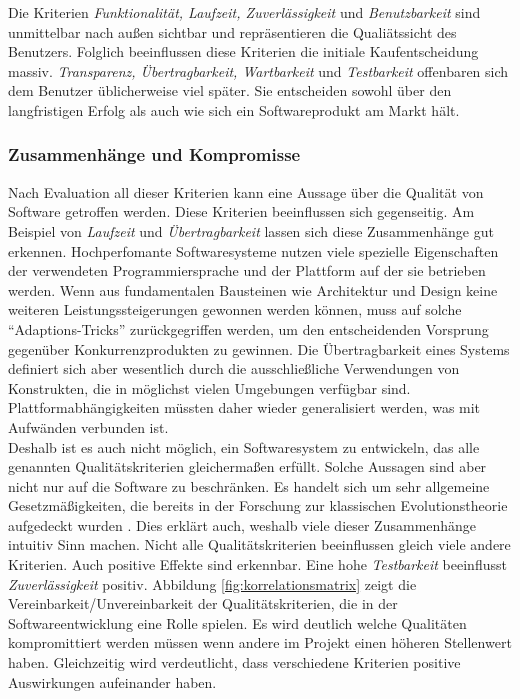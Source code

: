 Die Kriterien \textit{Funktionalität, Laufzeit, Zuverlässigkeit} und \textit{Benutzbarkeit} sind unmittelbar nach außen sichtbar und repräsentieren die Qualiätssicht des Benutzers. Folglich beeinflussen diese Kriterien die initiale Kaufentscheidung massiv. \textit{Transparenz, Übertragbarkeit, Wartbarkeit} und \textit{Testbarkeit} offenbaren sich dem Benutzer üblicherweise viel später. Sie entscheiden sowohl über den langfristigen Erfolg als auch wie sich ein Softwareprodukt am Markt hält.

\subsubsection{Zusammenhänge und Kompromisse} 
Nach Evaluation all dieser Kriterien kann eine Aussage über die Qualität von Software getroffen werden. Diese Kriterien beeinflussen sich gegenseitig. Am Beispiel von \textit{Laufzeit} und \textit{Übertragbarkeit} lassen sich diese Zusammenhänge gut erkennen. Hochperfomante Softwaresysteme nutzen viele spezielle Eigenschaften der verwendeten Programmiersprache und der Plattform auf der sie betrieben werden. Wenn aus fundamentalen Bausteinen wie Architektur und Design keine weiteren Leistungssteigerungen gewonnen werden können, muss auf solche ``Adaptions-Tricks'' zurückgegriffen werden, um den entscheidenden Vorsprung gegenüber Konkurrenzprodukten zu gewinnen. Die Übertragbarkeit eines Systems definiert sich aber wesentlich durch die ausschließliche Verwendungen von Konstrukten, die in möglichst vielen Umgebungen verfügbar sind. Plattformabhängigkeiten müssten daher wieder generalisiert werden, was mit Aufwänden verbunden ist.\\
Deshalb ist es auch nicht möglich, ein Softwaresystem zu entwickeln, das alle genannten Qualitätskriterien gleichermaßen erfüllt. Solche Aussagen sind aber nicht nur auf die Software zu beschränken. Es handelt sich um sehr allgemeine Gesetzmäßigkeiten, die bereits in der Forschung zur klassischen Evolutionstheorie aufgedeckt wurden \cite{hoffmann_software-qualitat_2013}. Dies erklärt auch, weshalb viele dieser Zusammenhänge intuitiv Sinn machen. Nicht alle Qualitätskriterien beeinflussen gleich viele andere Kriterien. Auch positive Effekte sind erkennbar. Eine hohe \textit{Testbarkeit} beeinflusst \textit{Zuverlässigkeit} positiv. Abbildung \ref{fig:korrelationsmatrix} zeigt die Vereinbarkeit/Unvereinbarkeit der Qualitätskriterien, die in der Softwareentwicklung eine Rolle spielen. Es wird deutlich welche Qualitäten kompromittiert werden müssen wenn andere im Projekt einen höheren Stellenwert haben. Gleichzeitig wird verdeutlicht, dass verschiedene Kriterien positive Auswirkungen aufeinander haben.

